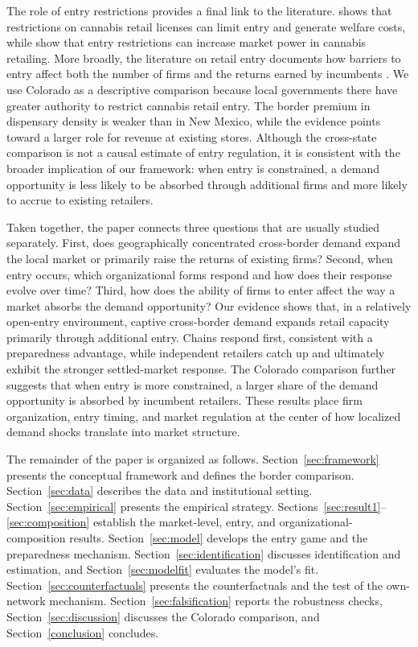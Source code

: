 \documentclass[english,12pt]{article}
\begin{document}
The role of entry restrictions provides a final link to the literature. \citet{Thomas2019} shows that restrictions on cannabis retail licenses can limit entry and generate welfare costs, while \citet{HollenbeckUetake2021} show that entry restrictions can increase market power in cannabis retailing. More broadly, the literature on retail entry documents how barriers to entry affect both the number of firms and the returns earned by incumbents \citep{CarreeThurik1996,SchivardiViviano2011}. We use Colorado as a descriptive comparison because local governments there have greater authority to restrict cannabis retail entry. The border premium in dispensary density is weaker than in New Mexico, while the evidence points toward a larger role for revenue at existing stores. Although the cross-state comparison is not a causal estimate of entry regulation, it is consistent with the broader implication of our framework: when entry is constrained, a demand opportunity is less likely to be absorbed through additional firms and more likely to accrue to existing retailers.

Taken together, the paper connects three questions that are usually studied separately. First, does geographically concentrated cross-border demand expand the local market or primarily raise the returns of existing firms? Second, when entry occurs, which organizational forms respond and how does their response evolve over time? Third, how does the ability of firms to enter affect the way a market absorbs the demand opportunity? Our evidence shows that, in a relatively open-entry environment, captive cross-border demand expands retail capacity primarily through additional entry. Chains respond first, consistent with a preparedness advantage, while independent retailers catch up and ultimately exhibit the stronger settled-market response. The Colorado comparison further suggests that when entry is more constrained, a larger share of the demand opportunity is absorbed by incumbent retailers. These results place firm organization, entry timing, and market regulation at the center of how localized demand shocks translate into market structure.

The remainder of the paper is organized as follows. Section~\ref{sec:framework} presents the conceptual framework and defines the border comparison. Section~\ref{sec:data} describes the data and institutional setting. Section~\ref{sec:empirical} presents the empirical strategy. Sections~\ref{sec:result1}--\ref{sec:composition} establish the market-level, entry, and organizational-composition results. Section~\ref{sec:model} develops the entry game and the preparedness mechanism. Section~\ref{sec:identification} discusses identification and estimation, and Section~\ref{sec:modelfit} evaluates the model's fit. Section~\ref{sec:counterfactuals} presents the counterfactuals and the test of the own-network mechanism. Section~\ref{sec:falsification} reports the robustness checks, Section~\ref{sec:discussion} discusses the Colorado comparison, and Section~\ref{conclusion} concludes.
\end{document}
